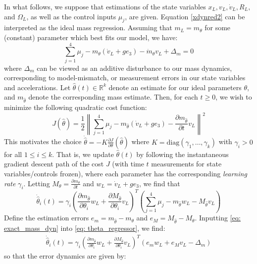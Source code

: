 \documentclass[letterpaper, 10 pt, conference]{ieeeconf}  %
\newcounter{part} %
\newcommand{\R}{\mathbb{R}}
\begin{document}
In what follows, we suppose that estimations of the state variables $x_L, v_L, \dot{v}_L, R_L,$ and $\Omega_L$, as well as the control inputs $\mu_j$, are given. Equation \eqref{xdynred2} can be interpreted as the ideal mass regression. Assuming that $m_L = m_\theta$ for some (constant) parameter which best fits our model, we have:
\begin{equation}\label{eq: exact_mass_dyn}
    \sum_{j=1}^4 \mu_j - m_\theta(\dot{v}_L + ge_3) - \dot{m}_\theta v_L + \Delta_m = 0
\end{equation}
where $\Delta_m$ can be viewed as an additive disturbance to our mass dynamics, corresponding to model-mismatch, or measurement errors in our state variables and accelerations. Let $\hat{\theta}(t) \in \R^k$ denote an estimate for our ideal parameters $\theta$, and $m_{\hat{\theta}}$ denote the corresponding mass estimate. Then, for each $t \ge 0$, we wish to minimize the following quadratic cost function:
$$J(\hat{\theta}) = \frac12 \left\|\sum_{j=1}^4 \mu_j - m_{\hat{\theta}}(\dot{v}_L + ge_3) - \frac{\partial m_{\hat{\theta}}}{\partial t} v_L \right\|^2$$
This motivates the choice $\displaystyle{\dot{\hat{\theta}} = -K \frac{\partial J}{\partial \theta}(\hat{\theta})}$ where $K= \text{diag}(\gamma_1, \dots, \gamma_k)$ with $\gamma_i > 0$ for all $1 \le i \le k$. That is, we update $\hat{\theta}(t)$ by following the instantaneous gradient descent path of the cost $J$ (with time $t$ measurements for state variables/controls frozen), where each parameter has the corresponding \textit{learning rate} $\gamma_i$. Letting $\displaystyle M_\theta = \frac{\partial m_\theta}{\partial t}$ and $w_L = \dot{v}_L + ge_3$, we find that
\small{\begin{equation}\label{eq: theta_regressor}
    \dot{\hat{\theta}}_i(t) = \gamma_i\left(\frac{\partial m_{\hat{\theta}}}{\partial \theta_i}w_L + \frac{\partial M_{\hat{\theta}}}{\partial \theta_i} v_L\right)^T\left(\sum_{j=1}^4 \mu_j - m_{\hat{\theta}}w_L - M_{\hat{\theta}}v_L \right)
\end{equation}}
\normalsize Define the estimation errors $e_m = m_{\hat{\theta}} - m_\theta$ and $e_M = M_{\hat{\theta}} - M_\theta$. Inputting \eqref{eq: exact_mass_dyn} into \eqref{eq: theta_regressor}, we find:
\begin{align*}
   \dot{\hat{\theta}}_i(t) = \gamma_i\left(\frac{\partial m_{\hat{\theta}}}{\partial \theta_i}w_L + \frac{\partial M_{\hat{\theta}}}{\partial \theta_i} v_L\right)^T \left(e_m w_L + e_M v_L - \Delta_m\right)
\end{align*} so that the error dynamics are given by:
\end{document}
